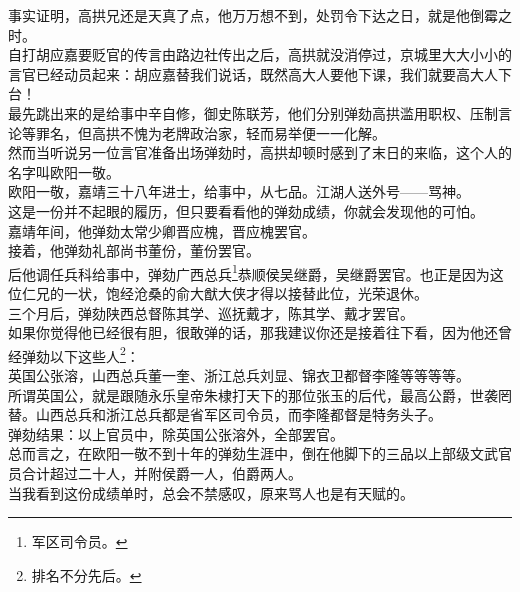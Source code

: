 \begin{multicols}{\theparacolNo}
事实证明，高拱兄还是天真了点，他万万想不到，处罚令下达之日，就是他倒霉之时。\\

自打胡应嘉要贬官的传言由路边社传出之后，高拱就没消停过，京城里大大小小的言官已经动员起来：胡应嘉替我们说话，既然高大人要他下课，我们就要高大人下台！\\

最先跳出来的是给事中辛自修，御史陈联芳，他们分别弹劾高拱滥用职权、压制言论等罪名，但高拱不愧为老牌政治家，轻而易举便一一化解。\\

然而当听说另一位言官准备出场弹劾时，高拱却顿时感到了末日的来临，这个人的名字叫欧阳一敬。\\

欧阳一敬，嘉靖三十八年进士，给事中，从七品。江湖人送外号——骂神。\\

这是一份并不起眼的履历，但只要看看他的弹劾成绩，你就会发现他的可怕。\\

嘉靖年间，他弹劾太常少卿晋应槐，晋应槐罢官。\\

接着，他弹劾礼部尚书董份，董份罢官。\\

后他调任兵科给事中，弹劾广西总兵\footnote{军区司令员。}恭顺侯吴继爵，吴继爵罢官。也正是因为这位仁兄的一状，饱经沧桑的俞大猷大侠才得以接替此位，光荣退休。\\

三个月后，弹劾陕西总督陈其学、巡抚戴才，陈其学、戴才罢官。\\

如果你觉得他已经很有胆，很敢弹的话，那我建议你还是接着往下看，因为他还曾经弹劾以下这些人\footnote{排名不分先后。}：\\

英国公张溶，山西总兵董一奎、浙江总兵刘显、锦衣卫都督李隆等等等等。\\

所谓英国公，就是跟随永乐皇帝朱棣打天下的那位张玉的后代，最高公爵，世袭罔替。山西总兵和浙江总兵都是省军区司令员，而李隆都督是特务头子。\\

弹劾结果：以上官员中，除英国公张溶外，全部罢官。\\

总而言之，在欧阳一敬不到十年的弹劾生涯中，倒在他脚下的三品以上部级文武官员合计超过二十人，并附侯爵一人，伯爵两人。\\

当我看到这份成绩单时，总会不禁感叹，原来骂人也是有天赋的。\\


\end{multicols}
